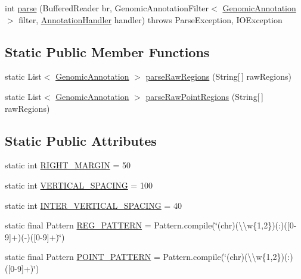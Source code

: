 \begin{DoxyCompactItemize}
\item 
int \hyperlink{classbroad_1_1core_1_1annotation_1_1_basic_genomic_annotation_reader_acf0c6dd924a5ca86fab0571132d8cd07}{parse} (Buffered\+Reader br, Genomic\+Annotation\+Filter$<$ \hyperlink{interfacebroad_1_1core_1_1annotation_1_1_genomic_annotation}{Genomic\+Annotation} $>$ filter, \hyperlink{interfacebroad_1_1core_1_1annotation_1_1_annotation_handler}{Annotation\+Handler} handler)  throws Parse\+Exception, I\+O\+Exception 
\end{DoxyCompactItemize}
\subsection*{Static Public Member Functions}
\begin{DoxyCompactItemize}
\item 
static List$<$ \hyperlink{interfacebroad_1_1core_1_1annotation_1_1_genomic_annotation}{Genomic\+Annotation} $>$ \hyperlink{classbroad_1_1core_1_1annotation_1_1_basic_genomic_annotation_reader_a4b090a21f71de7a1f6a550e5a047a9dc}{parse\+Raw\+Regions} (String\mbox{[}$\,$\mbox{]} raw\+Regions)
\item 
static List$<$ \hyperlink{interfacebroad_1_1core_1_1annotation_1_1_genomic_annotation}{Genomic\+Annotation} $>$ \hyperlink{classbroad_1_1core_1_1annotation_1_1_basic_genomic_annotation_reader_afedbf99d5bfed54c75e5c875a3e75aa3}{parse\+Raw\+Point\+Regions} (String\mbox{[}$\,$\mbox{]} raw\+Regions)
\end{DoxyCompactItemize}
\subsection*{Static Public Attributes}
\begin{DoxyCompactItemize}
\item 
static int \hyperlink{classbroad_1_1core_1_1annotation_1_1_basic_genomic_annotation_reader_abf139641b2a2a4c69c5659a18ae8cf86}{R\+I\+G\+H\+T\+\_\+\+M\+A\+R\+G\+I\+N} = 50
\item 
static int \hyperlink{classbroad_1_1core_1_1annotation_1_1_basic_genomic_annotation_reader_a24b39789f7632a795032438895c93973}{V\+E\+R\+T\+I\+C\+A\+L\+\_\+\+S\+P\+A\+C\+I\+N\+G} = 100
\item 
static int \hyperlink{classbroad_1_1core_1_1annotation_1_1_basic_genomic_annotation_reader_a7150fc4987cb783f7c26a60312b6cc37}{I\+N\+T\+E\+R\+\_\+\+V\+E\+R\+T\+I\+C\+A\+L\+\_\+\+S\+P\+A\+C\+I\+N\+G} = 40
\item 
static final Pattern \hyperlink{classbroad_1_1core_1_1annotation_1_1_basic_genomic_annotation_reader_a2a409acebe2e7fc9e51c4c901cdad6b6}{R\+E\+G\+\_\+\+P\+A\+T\+T\+E\+R\+N} = Pattern.\+compile(\char`\"{}(chr)(\textbackslash{}\textbackslash{}w\{1,2\})(\+:)(\mbox{[}0-\/9\mbox{]}+)(-\/)(\mbox{[}0-\/9\mbox{]}+)\char`\"{})
\item 
static final Pattern \hyperlink{classbroad_1_1core_1_1annotation_1_1_basic_genomic_annotation_reader_aa04f665d433b3fffeb6fead8409a84ba}{P\+O\+I\+N\+T\+\_\+\+P\+A\+T\+T\+E\+R\+N} = Pattern.\+compile(\char`\"{}(chr)(\textbackslash{}\textbackslash{}w\{1,2\})(\+:)(\mbox{[}0-\/9\mbox{]}+)\char`\"{})
\end{DoxyCompactItemize}
